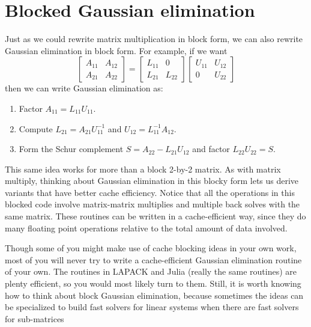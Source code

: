 \documentclass[12pt, leqno]{article} %
\begin{document}
\section{Blocked Gaussian elimination}
Just as we could rewrite matrix multiplication in block form, we can also
rewrite Gaussian elimination in block form.  For example, if we want
\[
  \begin{bmatrix} A_{11} & A_{12} \\ A_{21} & A_{22} \end{bmatrix} =
  \begin{bmatrix} L_{11} & 0 \\ L_{21} & L_{22} \end{bmatrix}
  \begin{bmatrix} U_{11} & U_{12} \\ 0 & U_{22} \end{bmatrix}
\]
then we can write Gaussian elimination as:
\begin{enumerate}
\item
  Factor $A_{11} = L_{11} U_{11}$.
\item
  Compute $L_{21} = A_{21} U_{11}^{-1}$ and $U_{12} = L_{11}^{-1} A_{12}$.
\item
  Form the Schur complement $S = A_{22} - L_{21} U_{12}$ and factor
  $L_{22} U_{22} = S$.
\end{enumerate}

This same idea works for more than a block 2-by-2 matrix.
As with matrix multiply, thinking about Gaussian elimination in this
blocky form lets us derive variants that have better cache efficiency.
Notice that all the operations in this blocked code involve matrix-matrix
multiplies and multiple back solves with the same matrix.  These routines
can be written in a cache-efficient way, since they do many floating point
operations relative to the total amount of data involved.

Though some of you might make use of cache blocking ideas in your own
work, most of you will never try to write a cache-efficient Gaussian
elimination routine of your own.  The routines in LAPACK and Julia
(really the same routines) are plenty efficient, so you would most
likely turn to them.  Still, it is worth knowing how to think about
block Gaussian elimination, because sometimes the ideas can be specialized
to build fast solvers for linear systems when there are fast solvers for
sub-matrices
\end{document}
